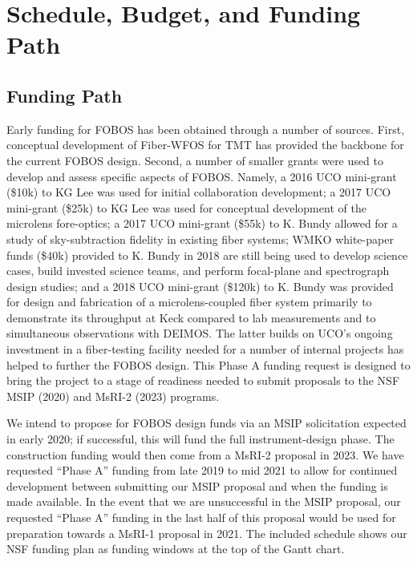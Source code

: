 
\section{Schedule, Budget, and Funding Path}
\label{sec:budget}

\subsection{Funding Path}

Early funding for FOBOS has been obtained through a number of sources.
First, conceptual development of Fiber-WFOS for TMT has provided the
backbone for the current FOBOS design. Second, a number of smaller
grants were used to develop and assess specific aspects of FOBOS.
Namely, a 2016 UCO mini-grant (\$10k) to KG Lee was used for initial
collaboration development; a 2017 UCO mini-grant (\$25k) to KG Lee was
used for conceptual development of the microlens fore-optics; a 2017 UCO
mini-grant (\$55k) to K. Bundy allowed for a study of sky-subtraction
fidelity in existing fiber systems; WMKO white-paper funds (\$40k)
provided to K. Bundy in 2018 are still being used to develop science
cases, build invested science teams, and perform focal-plane and
spectrograph design studies; and a 2018 UCO mini-grant (\$120k) to K.
Bundy was provided for design and fabrication of a microlens-coupled
fiber system primarily to demonstrate its throughput at Keck compared to
lab measurements and to simultaneous observations with DEIMOS. The
latter builds on UCO's ongoing investment in a fiber-testing facility
needed for a number of internal projects has helped to further the FOBOS
design. This Phase A funding request is designed to bring the project to
a stage of readiness needed to submit proposals to the NSF MSIP (2020)
and MsRI-2 (2023) programs.

We intend to propose for FOBOS design funds via an MSIP solicitation
expected in early 2020; if successful, this will fund the full
instrument-design phase. The construction funding would then come
from a MsRI-2 proposal in 2023. We have requested ``Phase A'' funding
from late 2019 to mid 2021 to allow for continued development between
submitting our MSIP proposal and when the funding is made available.
In the event that we are unsuccessful in the MSIP proposal, our
requested ``Phase A'' funding in the last half of this proposal would
be used for preparation towards a MsRI-1 proposal in 2021. The
included schedule shows our NSF funding plan as funding windows at
the top of the Gantt chart.

